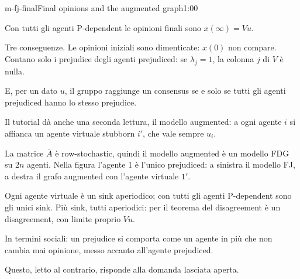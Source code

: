 \begin{slide}{m-fj-final}{Final opinions and the augmented graph}{1:00}
  \begin{discorso}
    \item Con tutti gli agenti P-dependent le opinioni finali sono $x(\infty)=Vu$.
    \item Tre conseguenze. Le opinioni iniziali sono dimenticate: $x(0)$ non compare. Contano solo i prejudice degli agenti prejudiced: se $\lambda_j=1$, la colonna $j$ di $V$ è nulla.
    \item E, per un dato $u$, il gruppo raggiunge un consensus se e solo se tutti gli agenti prejudiced hanno lo stesso prejudice.
    \item Il tutorial dà anche una seconda lettura, il modello augmented: a ogni agente $i$ si affianca un agente virtuale stubborn $i'$, che vale sempre $u_i$.
    \item La matrice $\bar A$ è row-stochastic, quindi il modello augmented è un modello FDG su $2n$ agenti. Nella figura l'agente 1 è l'unico prejudiced: a sinistra il modello FJ, a destra il grafo augmented con l'agente virtuale $1'$.
    \item Ogni agente virtuale è un sink aperiodico; con tutti gli agenti P-dependent sono gli unici sink. Più sink, tutti aperiodici: per il teorema del disagreement è un disagreement, con limite proprio $Vu$.
    \item In termini sociali: un prejudice si comporta come un agente in più che non cambia mai opinione, messo accanto all'agente prejudiced.
    \item Questo, letto al contrario, risponde alla domanda lasciata aperta.
  \end{discorso}
\end{slide}

